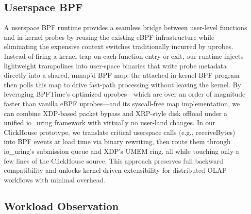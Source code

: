 \documentclass[sigconf,10pt]{acmart}
\begin{document}
\subsection{Userspace BPF}
A userspace BPF runtime provides a seamless bridge between user-level functions and in-kernel probes by reusing the existing eBPF infrastructure while eliminating the expensive context switches traditionally incurred by uprobes. Instead of firing a kernel trap on each function entry or exit, our runtime injects lightweight trampolines into user-space binaries that write probe metadata directly into a shared, mmap’d BPF map; the attached in-kernel BPF program then polls this map to drive fast-path processing without leaving the kernel. By leveraging BPFTime’s optimized uprobes—which are over an order of magnitude faster than vanilla eBPF uprobes—and its syscall-free map implementation, we can combine XDP-based packet bypass and XRP-style disk offload under a unified io\_uring framework with virtually no user-land changes. In our ClickHouse prototype, we translate critical userspace calls (e.g., receiveBytes) into BPF events at load time via binary rewriting, then route them through io\_uring’s submission queue and XDP’s UMEM ring, all while touching only a few lines of the ClickHouse source. This approach preserves full backward compatibility and unlocks kernel-driven extensibility for distributed OLAP workflows with minimal overhead.

\subsection{Workload Observation}
\end{document}
